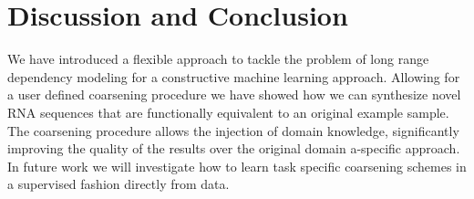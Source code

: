 \documentclass{article}
\begin{document}
 
\section{Discussion and Conclusion}

We have introduced a flexible approach to tackle the problem of long range
dependency modeling for a constructive machine learning approach. Allowing for
a user defined coarsening procedure we have showed how we can synthesize novel
RNA sequences that are functionally equivalent to an original example sample.
The coarsening procedure allows the injection of domain knowledge,
significantly improving the quality of the results over the original domain a-specific approach. In future work we will investigate how to learn task
specific coarsening schemes in a supervised fashion directly from data.



\end{document}
